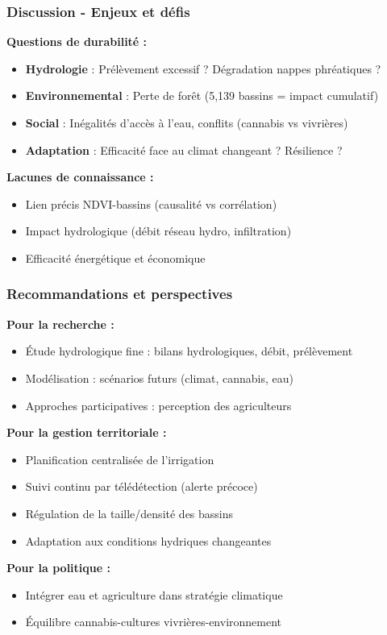 \documentclass{beamer}
\begin{document}
\begin{frame}
\frametitle{Discussion - Enjeux et défis}
\textbf{Questions de durabilité :}
\begin{itemize}
  \item \textbf{Hydrologie} : Prélèvement excessif ? Dégradation nappes phréatiques ?
  \item \textbf{Environnemental} : Perte de forêt (5,139 bassins = impact cumulatif)
  \item \textbf{Social} : Inégalités d'accès à l'eau, conflits (cannabis vs vivrières)
  \item \textbf{Adaptation} : Efficacité face au climat changeant ? Résilience ?
\end{itemize}

\textbf{Lacunes de connaissance :}
\begin{itemize}
  \item Lien précis NDVI-bassins (causalité vs corrélation)
  \item Impact hydrologique (débit réseau hydro, infiltration)
  \item Efficacité énergétique et économique
\end{itemize}
\end{frame}

\begin{frame}
\frametitle{Recommandations et perspectives}
\textbf{Pour la recherche :}
\begin{itemize}
  \item Étude hydrologique fine : bilans hydrologiques, débit, prélèvement
  \item Modélisation : scénarios futurs (climat, cannabis, eau)
  \item Approches participatives : perception des agriculteurs
\end{itemize}

\textbf{Pour la gestion territoriale :}
\begin{itemize}
  \item Planification centralisée de l'irrigation
  \item Suivi continu par télédétection (alerte précoce)
  \item Régulation de la taille/densité des bassins
  \item Adaptation aux conditions hydriques changeantes
\end{itemize}

\textbf{Pour la politique :}
\begin{itemize}
  \item Intégrer eau et agriculture dans stratégie climatique
  \item Équilibre cannabis-cultures vivrières-environnement
\end{itemize}
\end{frame}
\end{document}
